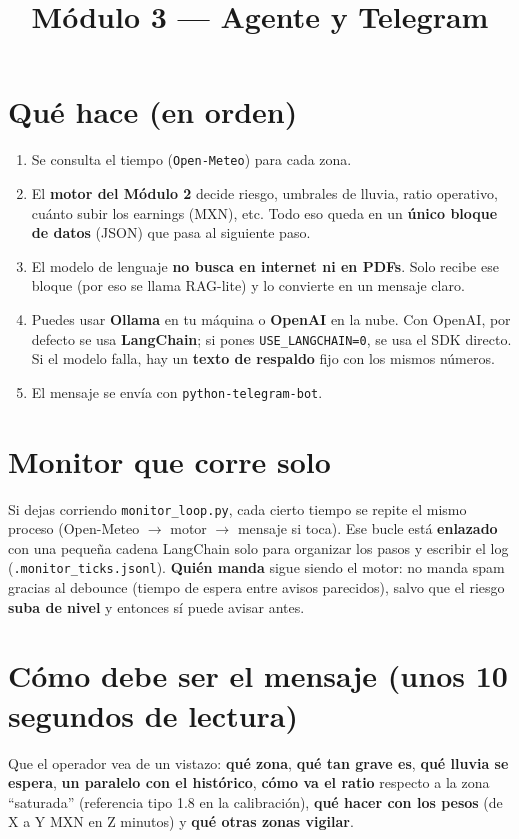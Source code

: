 \documentclass[11pt,a4paper]{article}
\title{Módulo 3 --- Agente y Telegram}
\author{}
\date{}
\begin{document}
\maketitle

\section*{Qué hace (en orden)}
\begin{enumerate}
  \item Se consulta el tiempo (\texttt{Open-Meteo}) para cada zona.
  \item El \textbf{motor del Módulo 2} decide riesgo, umbrales de lluvia, ratio operativo, cuánto subir los earnings (MXN), etc. Todo eso queda en un \textbf{único bloque de datos} (JSON) que pasa al siguiente paso.
  \item El modelo de lenguaje \textbf{no busca en internet ni en PDFs}. Solo recibe ese bloque (por eso se llama RAG-lite) y lo convierte en un mensaje claro.
  \item Puedes usar \textbf{Ollama} en tu máquina o \textbf{OpenAI} en la nube. Con OpenAI, por defecto se usa \textbf{LangChain}; si pones \texttt{USE\_LANGCHAIN=0}, se usa el SDK directo. Si el modelo falla, hay un \textbf{texto de respaldo} fijo con los mismos números.
  \item El mensaje se envía con \texttt{python-telegram-bot}.
\end{enumerate}

\section*{Monitor que corre solo}
Si dejas corriendo \texttt{monitor\_loop.py}, cada cierto tiempo se repite el mismo proceso (Open-Meteo $\rightarrow$ motor $\rightarrow$ mensaje si toca). Ese bucle está \textbf{enlazado} con una pequeña cadena LangChain solo para organizar los pasos y escribir el log (\texttt{.monitor\_ticks.jsonl}). \textbf{Quién manda} sigue siendo el motor: no manda spam gracias al debounce (tiempo de espera entre avisos parecidos), salvo que el riesgo \textbf{suba de nivel} y entonces sí puede avisar antes.

\section*{Cómo debe ser el mensaje (unos 10 segundos de lectura)}
Que el operador vea de un vistazo: \textbf{qué zona}, \textbf{qué tan grave es}, \textbf{qué lluvia se espera}, \textbf{un paralelo con el histórico}, \textbf{cómo va el ratio} respecto a la zona ``saturada'' (referencia tipo 1.8 en la calibración), \textbf{qué hacer con los pesos} (de X a Y MXN en Z minutos) y \textbf{qué otras zonas vigilar}.
\end{document}
